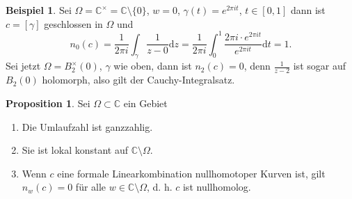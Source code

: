\documentclass[11pt,titlepage]{article}
\theoremstyle{definition}
\newtheorem{proposition}[theorem]{Proposition}
\newtheorem{example}[theorem]{Beispiel}
\theoremstyle{remark}
\begin{document}
	\begin{example}
		Sei $\Omega=\mathbb{C}^{\times}=\mathbb{C}\setminus\{0\}$, $w=0$, $\gamma(t)=e^{2\pi it}$, 
		$t\in[0,1]$ dann ist $c=[\gamma]$ geschlossen in $\Omega$ und 
		\[ n_0(c)=\frac{1}{2\pi i} \int_{\gamma}\frac{1}{z-0}\mathrm{d}z =\frac{1}{2\pi i} \int_0^1 
		\frac{2\pi i\cdot e^{2\pi it}}{e^{2\pi it}} \mathrm{d}t=1. \]
		Sei jetzt $\Omega =B_2^{\times}(0)$, $\gamma$ wie oben, dann ist $n_2(c)=0$, denn 
		$\frac{1}{z-2}$ ist sogar auf $B_2(0)$ holomorph, also gilt der Cauchy-Integralsatz.
	\end{example}
	
	\begin{proposition}
		Sei $\Omega\subset\mathbb{C}$ ein Gebiet
		\begin{enumerate}
			\item Die Umlaufzahl ist ganzzahlig. \label{prop:umlauf1}
			\item Sie ist lokal konstant auf $\mathbb{C}\setminus\Omega$. \label{prop:umlauf2}
			\item Wenn $c$ eine formale Linearkombination nullhomotoper Kurven ist, gilt 
			$n_w(c)=0$ für alle $w\in\mathbb{C}\setminus\Omega$, d. h. $c$ ist nullhomolog. 
			\label{prop:umlauf3}
		\end{enumerate}
	\end{proposition}
	
\end{document}
